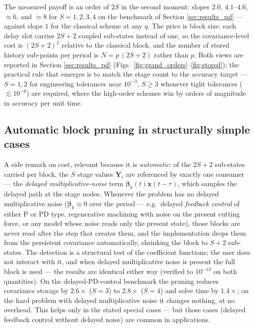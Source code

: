 \documentclass[preprint,12pt]{elsarticle}
\begin{document}
The measured payoff is an order of $2S$ in the second moment: slopes $2.0$, $4.1$--$4.6$, $\approx 6$, and $\approx 8$ for $S=1,2,3,4$ on the benchmark of Section \ref{sec:results_pd} --- against slope $1$ for the classical scheme at any $q$. The price is block size: each delay slot carries $2S+2$ coupled sub-states instead of one, so the covariance-level cost is $(2S+2)^2$ relative to the classical block, and the number of stored history sub-points per period is $N = p\,(2S+2)$ rather than $p$. Both views are reported in Section \ref{sec:results_pd} (Figs.~\ref{fig:grand_orders}--\ref{fig:stored}); the practical rule that emerges is to match the stage count to the accuracy target --- $S=1,2$ for engineering tolerances near $10^{-3}$, $S \ge 3$ whenever tight tolerances ($\lesssim 10^{-6}$) are required, where the high-order schemes win by orders of magnitude in accuracy per unit time.

\subsection{Automatic block pruning in structurally simple cases}
\label{sec:pruning}
A side remark on cost, relevant because it is \emph{automatic}: of the $2S+2$ sub-states carried per block, the $S$ stage values $\mathbf{Y}_i$ are referenced by exactly one consumer --- the \emph{delayed multiplicative-noise} term $\boldsymbol\beta_k(t)\mathbf{x}(t-\tau)$, which samples the delayed path at the stage nodes. Whenever the problem has no delayed multiplicative noise ($\boldsymbol\beta_k \equiv 0$ over the period --- e.g.\ delayed \emph{feedback control} of either P or PD type, regenerative machining with noise on the present cutting force, or any model whose noise reads only the present state), those blocks are never read after the step that creates them, and the implementation drops them from the persistent covariance automatically, shrinking the block to $S+2$ sub-states. The detection is a structural test of the coefficient functions; the user does not interact with it, and when delayed multiplicative noise is present the full block is used --- the results are identical either way (verified to $10^{-13}$ on both quantities). On the delayed-PD-control benchmark the pruning reduces covariance storage by $2.6\times$ ($S{=}3$) to $2.8\times$ ($S{=}4$) and solve time by $1.4\times$; on the hard problem with delayed multiplicative noise it changes nothing, at no overhead. This helps only in the stated special cases --- but those cases (delayed feedback control without delayed noise) are common in applications.
\end{document}
